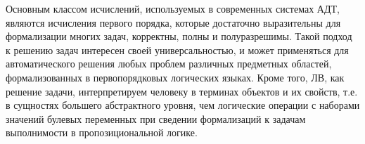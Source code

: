 \documentclass[a4paper]{report}
\begin{document}
Основным классом исчислений, используемых в современных системах АДТ, являются исчисления первого порядка, которые достаточно выразительны для формализации многих задач, корректны, полны и полуразрешимы. Такой подход к решению задач интересен своей универсальностью, и может применяться для автоматического решения любых проблем различных предметных областей, формализованных в первопорядковых логических языках. Кроме того, ЛВ, как решение задачи, интерпретируем человеку в терминах объектов и их свойств, т.е. в сущностях большего абстрактного уровня, чем  логические операции с наборами значений булевых переменных при сведении формализаций к задачам выполнимости в пропозициональной логике.


\end{document}
